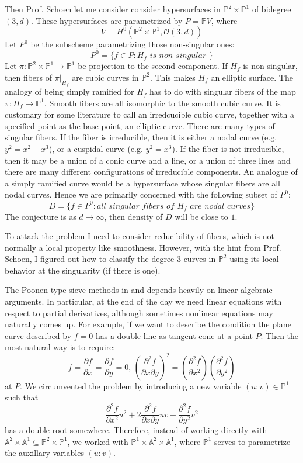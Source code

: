 \documentclass[12pt]{article}
\theoremstyle{plain}
\theoremstyle{definition}
\newcommand{\IA}{\mathbb{A}}
\newcommand{\IP}{\mathbb{P}}
\newcommand{\sO}{\mathcal{O}}
\newcommand{\<}{\langle}
\renewcommand{\>}{\rangle}
\newcommand{\p}{\partial}
\begin{document}
Then Prof. Schoen let me consider consider hypersurfaces in $\IP^2 \times \IP^1$ of bidegree $(3, d)$. These hypersurfaces are parametrized by $P = \IP V$, where
$$ V = H^0 ( \IP^2 \times \IP^1, \sO(3, d) ) $$
Let $P^0$ be the subscheme parametrizing those non-singular ones:
$$ P^0 = \{ f \in P : H_f \textit{ is non-singular }\} $$
Let $\pi : \IP^2 \times \IP^1 \to \IP^1$ be projection to the second component. If $H_f$ is non-singular, then fibers of $\pi|_{H_f}$ are cubic curves in $\IP^2$. This makes $H_f$ an elliptic surface. The analogy of being simply ramified for $H_f$ has to do with singular fibers of the map $\pi : H_f \to \IP^1$. Smooth fibers are all isomorphic to the smooth cubic curve. It is customary for some literature to call an irredcucible cubic curve, together with a specified point as the base point, an elliptic curve. There are many types of singular fibers. If the fiber is irreducible, then it is either a nodal curve (e.g. $y^2 = x^2 - x^3$), or a cuspidal curve (e.g. $y^2 = x^3$). If the fiber is not irreducible, then it may be a union of a conic curve and a line, or a union of three lines and there are many different configurations of irreducible components. 
An analogue of a simply ramified curve would be a hypersurface whose singular fibers are all nodal curves. Hence we are primarily concerned with the following subset of $P^0$: 
$$ D = \{ f \in P^0 : \textit{all singular fibers of $H_f$ are nodal curves} \}$$
The conjecture is as $d \to \infty$, then density of $D$ will be close to $1$. 

To attack the problem I need to consider reducibility of fibers, which is not normally a local property like smoothness. However, with the hint from Prof. Schoen, I figured out how to classify the degree 3 curves in $\IP^2$ using its local behavior at the singularity (if there is one). 

The Poonen type sieve methods in \cite{Poonen} and \cite{Wood} depends heavily on linear algebraic arguments. In particular, at the end of the day we need linear equations with respect to partial derivatives, although sometimes nonlinear equations may naturally comes up. For example, if we want to describe the condition the plane curve described by $f = 0$ has a double line as tangent cone at a point $P$. Then the most natural way is to require:
$$f = \frac{\p f}{\p x} = \frac{\p f}{\p y} = 0,\, (\frac{\p^2 f}{\p x \p y})^2 = (\frac{\p^2 f}{\p x^2})(\frac{\p^2 f}{\p y^2})$$ at $P$. 
We circumvented the problem by introducing a new variable $(u : v) \in \IP^1$ such that 
$$ \frac{\p^2 f}{\p x^2} u^2 + 2 \frac{\p^2 f}{\p x \p y} uv + \frac{\p^2 f}{\p y^2} v^2 $$ has a double root somewhere. Therefore, instead of working directly with $\IA^2 \times \IA^1 \subseteq \IP^2 \times \IP^1$, we worked with $\IP^1 \times \IA^2 \times \IA^1$, where $\IP^1$ serves to parametrize the auxillary variables $(u : v)$. 
\end{document}
